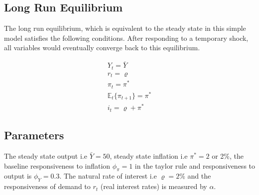 \documentclass[12pt]{article}
\newcommand{\1}{\mathbbm 1}
\renewcommand{\rho}{\varrho}
\begin{document}










	
		\subsection{Long Run Equilibrium}
		
		The long run equilibrium, which is equivalent to the steady state in this simple model satisfies the following conditions. After responding to a temporary shock, all variables would eventually converge back to this equilibrium.
		
		
		\begin{equation*}
			\begin{split}
			Y_{t} = \bar{Y} \\
			r_{t} = \rho \\
			\pi_{t} = \pi^{*} \\
			\mathbb{E}_{t}\{\pi_{t+1}\} = \pi^{*} \\
			i_{t} = \rho + \pi^{*}
			\end{split}
		\end{equation*}
	
	\subsection{Parameters}
	
	The steady state output i.e $\bar{Y} = 50$, steady state inflation i.e $\pi^{*} = 2$ or 2\%, the baseline responsiveness to inflation $\phi_{\pi} = 1$ in the taylor rule and responsiveness to output is $\phi_{Y} = 0.3$. The natural rate of interest i.e $\rho = 2\%$ and the responsiveness of demand to $r_{t}$ (real interest rates) is measured by $\alpha$.
	
\end{document}
